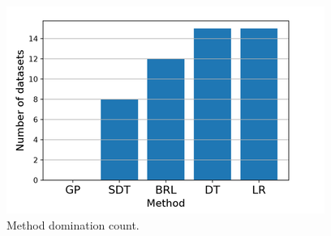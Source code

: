 \begin{center}
\begin{figure}[h]
\includegraphics{domination_bar_chart}
\caption{Method domination count.}
\end{figure}
\end{center}




